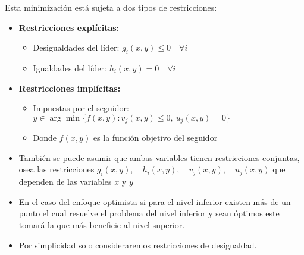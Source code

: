 
\newpage


Esta minimización está sujeta a dos tipos de restricciones: 
\begin{itemize}
    \item \textbf{Restricciones explícitas:}
    \begin{itemize}
        \item Desigualdades del líder: \( g_i(x,y) \leq 0 \quad \forall i \)
        \item Igualdades del líder: \( h_i(x,y) = 0 \quad \forall i \)
    \end{itemize}
    
    \item \textbf{Restricciones implícitas:}
    \begin{itemize}
        \item Impuestas por el seguidor: \( y \in \arg\min\{f(x, y) : v_j(x,y) \leq 0,\ u_j(x,y) = 0\} \)
        \item Donde \( f(x, y) \) es la función objetivo del seguidor
    \end{itemize}
    
	 
	\item También se puede asumir que ambas variables tienen restricciones conjuntas, osea las restricciones $ g_i(x,y), \quad h_i(x,y), \quad v_j(x,y), \quad u_j(x,y) $ que dependen de las variables $x$ y $y$
	
    \item En el caso del enfoque optimista si para el nivel inferior existen más de un punto el cual resuelve el problema del nivel inferior y sean óptimos este tomará la que más beneficie al nivel superior. 
    \item Por simplicidad solo  consideraremos restricciones de desigualdad.
\end{itemize}


